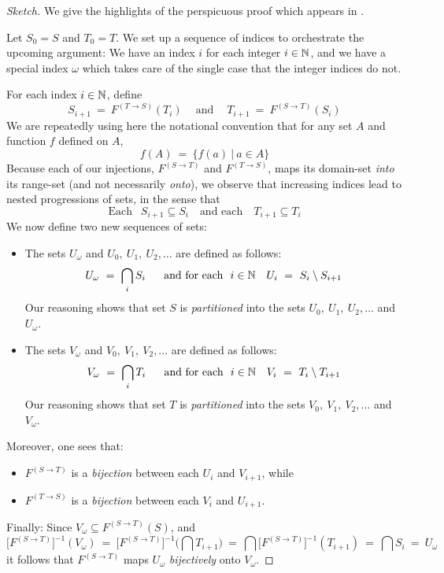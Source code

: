 \begin{proof}[Sketch]
We give the highlights of the perspicuous proof which appears in \cite{Tonien07}.

\smallskip

Let $S_0 = S$ and $T_0 = T$.  We set up a sequence of indices to orchestrate the upcoming argument: We have an index $i$ for each integer $i \in \mathbb{N}$, and we have a special index $\omega$ which takes care of the single case that the integer indices do not.


For each index $i \in \mathbb{N}$, define
\[ S_{i+1} \ = \ F^{(T \rightarrow S)}(T_i) \ \ \ \ \mbox{ and }
\ \ \ \ T_{i+1} \ = \ F^{(S \rightarrow T)}(S_i) 
\]
We are repeatedly using here the notational convention that for any set $A$ and function $f$ defined on $A$,
\[ f(A) \ = \ \{ f(a) \ | \ a \in A \} \]
Because each of our injections, $F^{(S \rightarrow T)}$ and $F^{(T \rightarrow S)}$, maps its domain-set {\em into} its range-set (and not necessarily {\em onto}), we observe that increasing indices lead to nested progressions of sets, in the sense that
\[ \mbox{Each } \ \  S_{i+1} \subseteq S_i
 \ \ \ \mbox{ and each } \ \ \ 
 T_{i+1} \subseteq T_i
\]
We now define two new sequences of sets:
\begin{itemize}
\item
The sets $U_\omega$  and $U_0, \ U_1, \ U_2, \ldots$ are defined as follows:
\[ U_\omega \ = \ \bigcap_i S_i \ \ \ \ \
\mbox{and for each } \  i \in \N \ \ \  U_i \ = \ S_i \setminus S_{i+1} \]
Our reasoning shows that set $S$ is {\em partitioned} into the sets $U_0, \ U_1, \ U_2, \ldots$ and $U_\omega$.
\medskip\item
The sets $V_\omega$  and $V_0, \ V_1, \ V_2, \ldots$ are defined as follows:
\[ V_\omega \ = \ \bigcap_i T_i \ \ \ \ \
\mbox{and for each } \  i \in \N \ \ \  V_i \ = \ T_i \setminus T_{i+1}
\]
Our reasoning shows that set $T$ is {\em partitioned} into the sets $V_0, \ V_1, \ V_2, \ldots$ and $V_\omega$.
\end{itemize}
Moreover, one sees that:
\begin{itemize}
\item
$F^{(S \rightarrow T)}$ is a {\em bijection} between each $U_i$ and $V_{i+1}$, while
\medskip\item
$F^{(T \rightarrow S)}$ is a {\em bijection} between each $V_i$ and $U_{i+1}$.
\end{itemize}
Finally: Since $V_\omega \subseteq F^{(S \rightarrow T)}(S)$, and
\[ \Big[F^{(S \rightarrow T)}\Big]^{-1} (V_\omega) \ = \
\Big[F^{(S \rightarrow T)}\Big]^{-1} \Big(\bigcap T_{i+1} \Big) \ = \
\bigcap \Big[F^{(S \rightarrow T)}\Big]^{-1} (T_{i+1}) \ = \
\bigcap S_i \ = \ U_\omega
\]
it follows that $F^{(S \rightarrow T)}$ maps $U_\omega$ {\em bijectively} onto $V_\omega$.


\end{proof}
